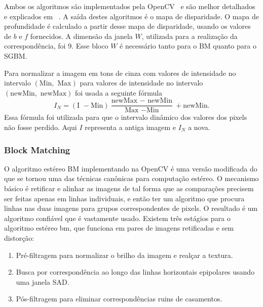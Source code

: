 \documentclass{bmvc2k}
\begin{document}
Ambos os algoritmos são implementados pela OpenCV~\cite{OpenCV} e são melhor detalhados e explicados em ~\cite{kaehler2016learning}. A saída destes algoritmos é o mapa de disparidade. O mapa de profundidade é calculado a partir desse mapa de disparidade, usando os valores de $b$ e $f$ fornecidos. A dimensão da janela $W$, utilizada para a realização da correspondência, foi 9. Esse bloco $W$ é necessário tanto para o BM quanto para o SGBM.

Para normalizar a imagem em tons de cinza com valores de intensidade no intervalo $(\mbox{Min}, \mbox{ Max})$ para valores de intensidade no intervalo $(\mbox{newMin}, \mbox{ newMax})$ foi usada a seguinte fórmula $$I_N = (\mbox{I } - \mbox{Min})\frac{\mbox{newMax } - \mbox{ newMin}}{\mbox{Max } - \mbox{Min}} + \mbox{newMin}.$$ Essa fórmula foi utilizada para que o intervalo dinâmico dos valores dos pixels não fosse perdido. Aqui $I$ representa a antiga imagem e $I_N$ a nova.
\subsubsection{Block Matching}
O algoritmo estéreo BM implementando na OpenCV é uma versão modificada do que se tornou uma das técnicas canônicas para computação estéreo. O mecanismo básico é retificar e alinhar as imagens de tal forma que as comparações precisem ser feitas apenas em linhas individuais, e então ter um algoritmo que procura linhas nas duas imagens para grupos correspondentes de pixels. O resultado é um algoritmo confiável que é vastamente usado. Existem três estágios para o algoritmo estéreo bm, que funciona em pares de imagens retificadas e sem distorção:
\begin{enumerate}
\item Pré-filtragem para normalizar o brilho da imagem e realçar a textura.
\item Busca por correspondência ao longo das linhas horizontais epipolares usando uma janela SAD.
\item Pós-filtragem para eliminar correspondências ruins de casamentos.
\end{enumerate}
\end{document}
